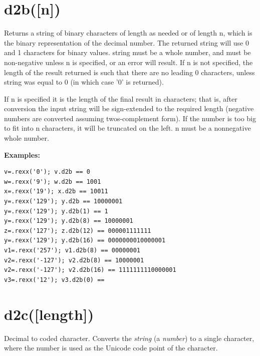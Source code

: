 \section{d2b([n{]})}\label{refd2b}

Returns a string of binary characters of length as needed or of length
n, which is the binary representation of the decimal number. The
returned string will use 0 and 1 characters for binary values. string
must be a whole number, and must be non-negative unless n is
specified, or an error will result. If n is not specified, the length
of the result returned is such that there are no leading 0 characters,
unless string was equal to 0 (in which case '0' is returned).

If n is specified it is the length of the final result in characters;
that is, after conversion the input string will be sign-extended to
the required length (negative numbers are converted assuming
twos-complement form). If the number is too big to fit into n
characters, it will be truncated on the left. n must be a nonnegative
whole number.

 \textbf{Examples:}
\begin{lstlisting}
v=.rexx('0'); v.d2b == 0 
w=.rexx('9'); w.d2b == 1001 
x=.rexx('19'); x.d2b == 10011 
y=.rexx('129'); y.d2b == 10000001 
y=.rexx('129'); y.d2b(1) == 1 
y=.rexx('129'); y.d2b(8) == 10000001 
z=.rexx('127'); z.d2b(12) == 000001111111 
y=.rexx('129'); y.d2b(16) == 0000000010000001 
v1=.rexx('257'); v1.d2b(8) == 00000001 
v2=.rexx('-127'); v2.d2b(8) == 10000001 
v2=.rexx('-127'); v2.d2b(16) == 1111111110000001 
v3=.rexx('12'); v3.d2b(0) == 
\end{lstlisting}

\section{d2c([length])}\label{refd2c}
Decimal to coded character.
Converts the \emph{string} (a \crexx{} \emph{number}) to a
single character, where the number is used as the Unicode code point of the
character.
 
